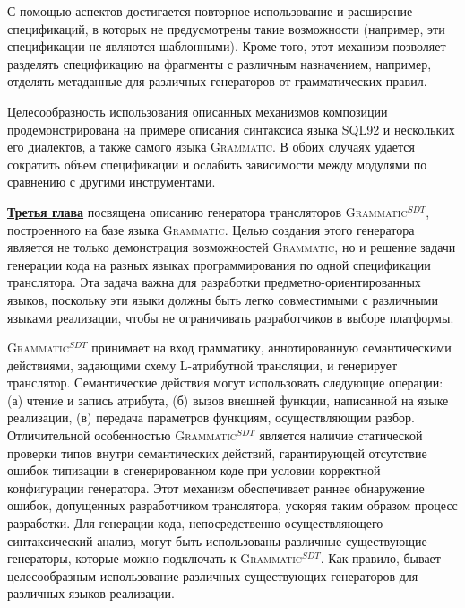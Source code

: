 \documentclass[12pt,a4paper]{article}
\newcommand{\tool}[1]{\textsc{#1}}
\theoremstyle{definition}
\theoremstyle{plain}
\newcommand{\GRM}{\tool{Grammatic}}
\newcommand{\ATF}{\tool{Grammatic$^{SDT}$}}
\newcommand{\afsubsection}[1]{\par \underline{\textbf{#1}}}
\begin{document}
С помощью аспектов достигается повторное использование  и расширение спецификаций, в которых не предусмотрены такие возможности (например, эти спецификации не являются шаблонными). Кроме того, этот механизм позволяет разделять спецификацию на фрагменты с различным назначением, например, отделять метаданные для различных генераторов от грамматических правил.

\begin{table}[htb]
	\centering
\newcommand{\dissonly}[1]{}

	\caption{Сравнение \GRM{} с существующими инструментами}\label{GrmTable}
\end{table}


Целесообразность использования описанных механизмов композиции продемонстрирована на примере описания синтаксиса языка SQL92 и нескольких его диалектов, а также самого языка \GRM{}. В обоих случаях удается сократить объем спецификации и ослабить зависимости между модулями по сравнению с другими инструментами.

\afsubsection{Третья глава} посвящена описанию генератора трансляторов \ATF{}, построенного на базе языка \GRM{}. Целью создания этого генератора является не только демонстрация возможностей \GRM{}, но и решение задачи генерации кода на разных языках программирования по одной спецификации транслятора. Эта задача важна для разработки предметно-ориентированных языков, поскольку эти языки должны быть легко совместимыми с различными языками реализации, чтобы не ограничивать разработчиков в выборе платформы.

\ATF{} принимает на вход грамматику, аннотированную семантическими действиями, задающими схему L-атрибутной трансляции, и генерирует транслятор. Семантические действия могут использовать следующие операции: (а) чтение и запись атрибута, (б) вызов внешней функции, написанной на языке реализации, (в) передача параметров функциям, осуществляющим разбор. 
Отличительной особенностью \ATF{} является наличие статической проверки типов внутри семантических действий, гарантирующей отсутствие ошибок типизации в сгенерированном коде при условии корректной конфигурации генератора. Этот механизм обеспечивает раннее обнаружение ошибок, допущенных разработчиком транслятора, ускоряя таким образом процесс разработки.
Для генерации кода, непосредственно осуществляющего синтаксический анализ, могут быть использованы различные существующие генераторы, которые можно подключать к \ATF{}. Как правило, бывает целесообразным использование различных существующих генераторов для различных языков реализации.
\end{document}
